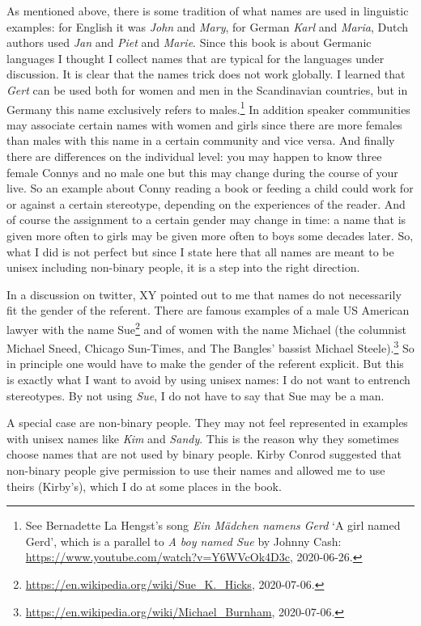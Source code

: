 As mentioned above, there is some tradition of what names are used in linguistic examples: for
English it was \emph{John} and \emph{Mary}, for German \emph{Karl} and \emph{Maria}, Dutch authors
used \emph{Jan} and \emph{Piet} and \emph{Marie}. Since this book is about Germanic languages I
thought I collect names that are typical for the languages under discussion. It is clear that the
names trick does not work globally. I learned that \emph{Gert} can be used both for women and
men in the Scandinavian countries, but in Germany this name exclusively refers to
males.\footnote{%
See Bernadette La Hengst's song \emph{Ein Mädchen namens Gerd} `A girl named Gerd', which is a parallel to \emph{A boy
  named Sue} by Johnny Cash: \url{https://www.youtube.com/watch?v=Y6WVcOk4D3c}, 2020-06-26.
} In
addition speaker communities may associate certain names with women and girls since there are more females
than males with this name in a certain community and vice versa. And finally there are differences
on the individual level: you may happen to know three female Connys and no male one but this may
change during the course of your live. So an example about Conny reading a book or feeding a child
could work for or against a certain stereotype, depending on the experiences of the reader. And of course the assignment to a certain gender may change in
time: a name that is given more often to girls may be given more often to boys some decades later. 
So, what I did is not perfect but since I state here that all names are meant to be unisex including
non-binary people, it is a step into the right direction.

In a discussion on twitter, XY pointed out to me that names do not necessarily fit the gender of the
referent. There are famous examples of a male US American lawyer with the name Sue\footnote{
\url{https://en.wikipedia.org/wiki/Sue_K._Hicks}, 2020-07-06.
} and of women with the name Michael (the columnist Michael Sneed, Chicago Sun-Times, and The
Bangles' bassist Michael Steele).\footnote{
  \url{https://en.wikipedia.org/wiki/Michael_Burnham}, 2020-07-06.
}
So in principle
one would have to make the gender of the referent explicit. But this is exactly what I want to avoid
by using unisex names: I do not want to entrench stereotypes. By not using \emph{Sue}, I do not have to say
that Sue may be a man.

A special case are non-binary people. They may not feel represented in examples with unisex
names like \emph{Kim} and \emph{Sandy}. This is the reason why they sometimes choose names that are
not used by binary people. Kirby Conrod suggested that non-binary people give permission to use their names and allowed me to
use theirs (Kirby's), which I do at some places in the book. 

